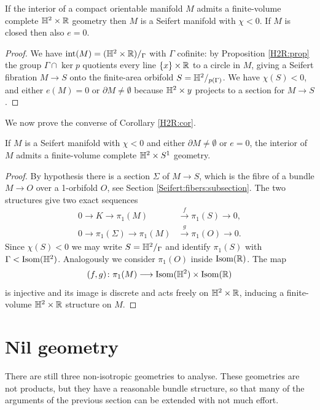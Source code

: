 \begin{cor} \label{H2R:cor}
If the interior of a compact orientable manifold $M$ admits a finite-volume complete $\mathbb{H}^2\times \mathbb{R}$ geometry then $M$ is a Seifert manifold with $\chi<0$. If $M$ is closed then also $e = 0$.
\end{cor}
\begin{proof}
We have ${\rm int}(M) = (\mathbb{H}^2\times \mathbb{R})/_\Gamma$ with $\Gamma$ cofinite: by Proposition \ref{H2R:prop} the group $\Gamma \cap \ker p$ quotients every line $\{x\}\times \mathbb{R}$ to a circle in $M$, giving a Seifert fibration $M\to S$ onto the finite-area orbifold $S=\mathbb{H}^2/_{p(\Gamma)}$. We have $\chi(S)<0$, and either $e(M)=0$ or $\partial M \neq \emptyset$ because $\mathbb{H}^2 \times y$ projects to a section for $M\to S$.
\end{proof}

We now prove the converse of Corollary \ref{H2R:cor}.
\begin{prop}
If $M$ is a Seifert manifold with  $\chi<0$ and either $\partial M \neq \emptyset$ or $e = 0$, the interior of $M$ admits a finite-volume complete $\mathbb{H}^2\times S^1$ geometry.
\end{prop}
\begin{proof}
By hypothesis there is a section $\Sigma$ of $M\to S$, which is the fibre of a bundle $M\to O$ over a 1-orbifold $O$, see Section \ref{Seifert:fibers:subsection}. The two structures give two exact sequences
\begin{align*}
0 \longrightarrow K \longrightarrow \pi_1(M) & \stackrel f\longrightarrow \pi_1(S) \longrightarrow 0, \\
0 \longrightarrow \pi_1(\Sigma) \longrightarrow \pi_1(M) & \stackrel g\longrightarrow \pi_1(O) \longrightarrow 0.
\end{align*}
Since $\chi(S)<0$ we may write $S= \mathbb{H}^2/_\Gamma$ and identify $\pi_1(S)$ with $\Gamma < {\rm Isom}(\mathbb{H}^2)$. Analogously we consider $\pi_1(O)$ inside ${\rm Isom}(\mathbb{R})$.
The map 
$$(f,g) \colon \pi_1(M) \longrightarrow {\rm Isom}(\mathbb{H}^2) \times {\rm Isom}(\mathbb{R})$$
is injective and its image is discrete and acts freely on $\mathbb{H}^2\times \mathbb{R}$, inducing a finite-volume $\mathbb{H}^2 \times \mathbb{R}$ structure on $M$.
\end{proof}

\section{Nil geometry}
There are still three non-isotropic geometries to analyse. These geometries are not products, but they have a reasonable bundle structure, so that many of the arguments of the previous section can be extended with not much effort.

